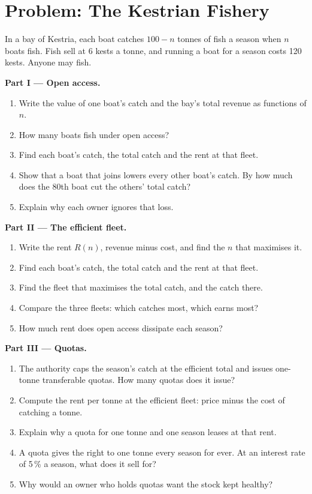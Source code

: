 \section{Problem: The Kestrian Fishery}

\begin{problem}
\label{pb:g11:public-goods-and-commons:1}
In a bay of Kestria, each boat catches $100 - n$ tonnes of fish a season when $n$ boats fish. Fish sell at 6 kests a tonne, and running a boat for a season costs
120 kests. Anyone may fish.

\medskip
\noindent\textbf{Part I --- Open access.}
\begin{enumerate}
\item Write the value of one boat's catch and the bay's total revenue as functions of $n$.
\item How many boats fish under open access?
\item Find each boat's catch, the total catch and the rent at that fleet.
\item Show that a boat that joins lowers every other boat's catch. By how much does the 80th boat cut the others' total catch?
\item Explain why each owner ignores that loss.
\end{enumerate}

\medskip
\noindent\textbf{Part II --- The efficient fleet.}
\begin{enumerate}[resume]
\item Write the rent $R(n)$, revenue minus cost, and find the $n$ that maximises it.
\item Find each boat's catch, the total catch and the rent at that fleet.
\item Find the fleet that maximises the total catch, and the catch there.
\item Compare the three fleets: which catches most, which earns most?
\item How much rent does open access dissipate each season?
\end{enumerate}

\medskip
\noindent\textbf{Part III --- Quotas.}
\begin{enumerate}[resume]
\item The authority caps the season's catch at the efficient total and issues one-tonne transferable quotas. How many quotas does it issue?
\item Compute the rent per tonne at the efficient fleet: price minus the cost of catching a tonne.
\item Explain why a quota for one tonne and one season leases at that rent.
\item A quota gives the right to one tonne every season for ever. At an interest rate of 5\,\% a season, what does it sell for?
\item Why would an owner who holds quotas want the stock kept healthy?
\end{enumerate}


\end{problem}
